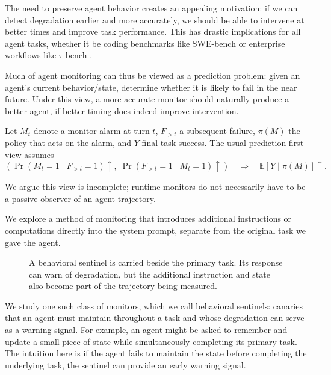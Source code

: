 \documentclass{article}
\begin{document}
The need to preserve agent behavior creates an appealing motivation: if we can detect degradation earlier and more accurately, we should be able to intervene at better times and improve task performance. This has drastic implications for all agent tasks, whether it be coding benchmarks like SWE-bench \citep{jimenez2024swebench} or enterprise workflows like $\tau$-bench \citep{yao2025taubench}.

Much of agent monitoring can thus be viewed as a prediction problem: given an agent's current behavior/state, determine whether it is likely to fail in the near future. Under this view, a more accurate monitor should naturally produce a better agent, if better timing does indeed improve intervention.

Let $M_t$ denote a monitor alarm at turn $t$, $F_{>t}$ a subsequent failure, $\pi(M)$ the policy that acts on the alarm, and $Y$ final task success. The usual prediction-first view assumes
\begin{equation}
  \left(
    \Pr(M_t=1\mid F_{>t}=1)\uparrow,\;
    \Pr(F_{>t}=1\mid M_t=1)\uparrow
  \right)
  \quad\Longrightarrow\quad
  \mathbb{E}[Y\mid\pi(M)]\uparrow.
  \label{eq:prediction-first}
\end{equation}

We argue this view is incomplete; runtime monitors do not necessarily have to be a passive observer of an agent trajectory.

We explore a method of monitoring that introduces additional instructions or computations directly into the system prompt, separate from the original task we gave the agent.

\begin{figure}[t]
  \centering
  
  \caption{A behavioral sentinel is carried beside the primary task. Its response can warn of degradation, but the additional instruction and state also become part of the trajectory being measured.}
  \label{fig:behavioral-sentinel}
\end{figure}

We study one such class of monitors, which we call behavioral sentinels: canaries that an agent must maintain throughout a task and whose degradation can serve as a warning signal. For example, an agent might be asked to remember and update a small piece of state while simultaneously completing its primary task. The intuition here is if the agent fails to maintain the state before completing the underlying task, the sentinel can provide an early warning signal.
\end{document}
